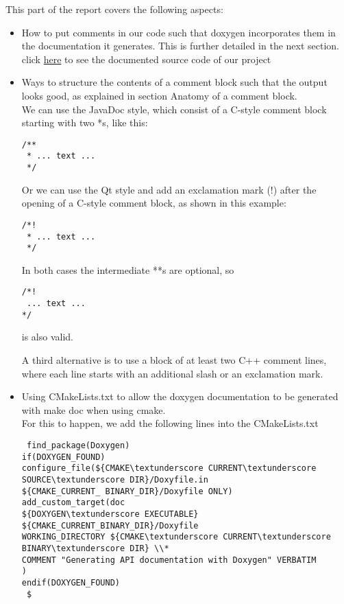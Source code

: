 \documentclass[11pt,utf8]{article}
\begin{document}
This part of the report covers the following aspects: \\
\begin{itemize}
\item How to put comments in our code such that doxygen incorporates them in the documentation it generates. This is further detailed in the next section. click \href{https://github.com/wkyoshe/stageM1/tree/master/src}{here} to see the documented source code of our project\\
\item Ways to structure the contents of a comment block such that the output looks good, as explained in section Anatomy of a comment block.\\
We can use the JavaDoc style, which consist of a C-style comment block starting with two *\textquotesingle s, like this:
 \begin{lstlisting}     
/**
 * ... text ...
 */
  \end{lstlisting}
Or we can use the Qt style and add an exclamation mark (!) after the opening of a C-style comment block, as shown in this example:
\begin {lstlisting}
/*!
 * ... text ...
 */
  \end{lstlisting}
In both cases the intermediate **\textquotesingle  s are optional, so
 \begin{lstlisting}
/*!
 ... text ...
*/
 \end{lstlisting}
is also valid.

A third alternative is to use a block of at least two C++ comment lines, where each line starts with an additional slash or an exclamation mark.
     
\item Using CMakeLists.txt to allow the doxygen documentation to be generated with make doc when using cmake.\\
For this to happen, we add the following lines into the  CMakeLists.txt 
 \begin{lstlisting}
 find_package(Doxygen)
if(DOXYGEN_FOUND)
configure_file(${CMAKE\textunderscore CURRENT\textunderscore SOURCE\textunderscore DIR}/Doxyfile.in 
${CMAKE_CURRENT_ BINARY_DIR}/Doxyfile ONLY)
add_custom_target(doc
${DOXYGEN\textunderscore EXECUTABLE} ${CMAKE_CURRENT_BINARY_DIR}/Doxyfile
WORKING_DIRECTORY ${CMAKE\textunderscore CURRENT\textunderscore BINARY\textunderscore DIR} \\*
COMMENT "Generating API documentation with Doxygen" VERBATIM
)
endif(DOXYGEN_FOUND)
 $ \end{lstlisting}
  
\end{itemize}
\end{document}
